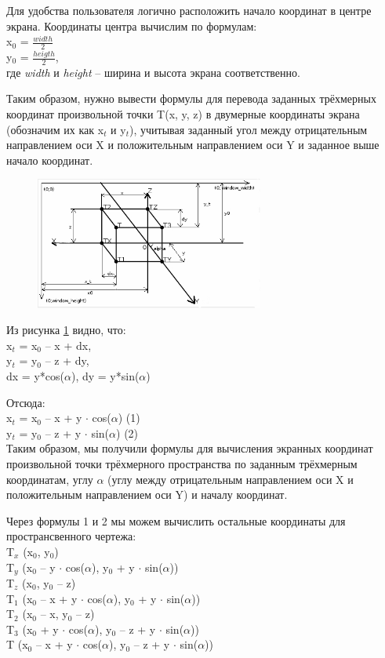 \documentclass[13pt]{extarticle}
\begin{document}
Для удобства пользователя логично расположить начало координат в центре экрана.
Координаты центра вычислим по формулам:
\\
x$_0$ = $\frac{width}{2}$
\\
y$_0$ = $\frac{heigth}{2}$,\\
где \emph{width} и \emph{height} -- ширина и высота экрана соответственно.

Таким образом, нужно вывести формулы для перевода заданных трёхмерных координат произвольной точки T(x, y, z) в двумерные координаты экрана (обозначим их как x$_t$ и y$_t$), учитывая заданный угол между отрицательным направлением оси X и положительным направлением оси Y и заданное выше начало координат.

	\begin{figure} 
		\includegraphics[width=0.67\textwidth]{Images/pointOnCoordinates}
		\caption{}%
		\label{fig:pointOnCoords}
	\end{figure}
	
Из рисунка \ref{fig:pointOnCoords} видно, что:
\\
	x$_t$ = x$_0$ -- x + dx, \\
	y$_t$ = y$_0$ -- z + dy, \\
	dx = y*cos($\alpha$), dy = y*sin($\alpha$)

	Отсюда:
\\
	x$_t$ = x$_0$ -- x + y $\cdot$ cos($\alpha$) (1)\\
	y$_t$ = y$_0$ -- z + y $\cdot$ sin($\alpha$) (2)\\
	
Таким образом, мы получили формулы для вычисления экранных координат произвольной точки трёхмерного пространства по заданным трёхмерным координатам, углу $\alpha$ (углу между отрицательным направлением оси X и положительным направлением оси Y) и началу координат.
	
	Через формулы 1 и 2 мы можем вычислить остальные координаты для пространсвенного чертежа:
	\\
	T$_x$ (x$_0$, y$_0$) \\
	T$_y$ (x$_0$ -- y $\cdot$ cos($\alpha$), y$_0$ + y $\cdot$ sin($\alpha$)) \\
	T$_z$ (x$_0$, y$_0$ -- z)\\
	T$_1$ (x$_0$ -- x + y $\cdot$ cos($\alpha$), y$_0$ + y $\cdot$ sin($\alpha$))\\
	T$_2$ (x$_0$ -- x, y$_0$ -- z)\\
	T$_3$ (x$_0$ + y $\cdot$ cos($\alpha$), y$_0$ -- z + y $\cdot$ sin($\alpha$))\\
	T (x$_0$ -- x + y $\cdot$ cos($\alpha$), y$_0$ -- z + y $\cdot$ sin($\alpha$))
	
\end{document}

